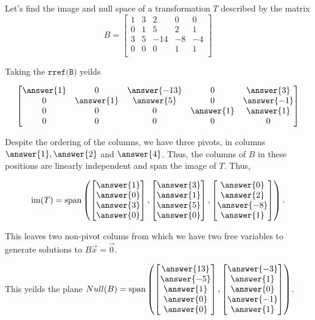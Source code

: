 \documentclass{ximera}
\begin{document}
\begin{example}
  Let's find the image and null space of a transformation $T$ described by the matrix 
  $$B=\begin{bmatrix}
        1 & 3 & 2 & 0 & 0  \\
        0 & 1 & 5 & 2 & 1  \\
        3 & 5 & -14 & -8 &-4  \\
        0 & 0 & 0 & 1 & 1  \\
        \end{bmatrix}$$

  Taking the $\texttt{rref(B)}$ yeilds

  $$\begin{bmatrix}
    \answer{1} & 0 & \answer{-13} & 0 & \answer{3} \\
    0 & \answer{1} & \answer{5} & 0 & \answer{-1} \\
    0 & 0 & 0 & \answer{1} & \answer{1} \\
    0 & 0 & 0 & 0 & 0
  \end{bmatrix}$$

  Despite the ordering of the columns, we have three pivots, in columns $\answer{1}, \answer{2}$ and $\answer{4}$. Thus, the columns of $B$ in these positions are linearly independent and span the image of $T$. Thus,

  $$\mbox{im}(T)=\mbox{span}\left(
  \begin{bmatrix}
  \answer{1} \\
  \answer{0} \\
  \answer{3} \\
  \answer{0}
  \end{bmatrix},
  \begin{bmatrix}
  \answer{3} \\
  \answer{1} \\
  \answer{5} \\
  \answer{0}
  \end{bmatrix},
  \begin{bmatrix}
  \answer{0} \\
  \answer{2} \\
  \answer{-8} \\
  \answer{1}
  \end{bmatrix}
  \right).$$

  This leaves two non-pivot colums from which we have two free variables to generate solutions to $B\vec{x}=\vec{0}$. 

  This yeilds the plane $Null(B)=\text{span}\left( \begin{bmatrix} 
    \answer{13} \\ 
    \answer{-5} \\ 
    \answer{1} \\ 
    \answer{0} \\ 
    \answer{0} 
    \end{bmatrix}, 
    \begin{bmatrix} 
    \answer{-3} \\ 
    \answer{1} \\ 
    \answer{0} \\ 
    \answer{-1} \\ 
    \answer{1} 
    \end{bmatrix}\right)$.
\end{example}
 
\end{document}

